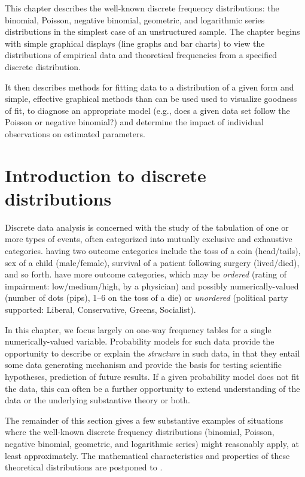 \documentclass[11pt]{book}\usepackage[]{graphicx}\usepackage[]{color}
\begin{document}
This chapter describes the well-known discrete
frequency distributions: the binomial, Poisson, negative binomial,
geometric, and logarithmic series distributions in the simplest case of an unstructured sample.
The chapter begins with simple graphical displays (line graphs and bar charts) to view
the distributions of empirical data and theoretical frequencies from a specified
discrete distribution.

It then describes methods for fitting data to a distribution of a given form
and simple, effective
graphical methods than can be used used to visualize goodness of fit,
to diagnose an appropriate model (e.g., does a given data set follow the
Poisson or negative binomial?) and determine the impact of
individual observations on estimated parameters.

\section{Introduction to discrete distributions}\label{sec:discrete-intro}
Discrete data analysis is concerned with the study of the tabulation of one or
more types of events, often categorized into mutually exclusive and exhaustive
categories.   having two outcome categories include
the toss of a coin (head/tails), sex of a child (male/female), survival of
a patient following surgery (lived/died), and so forth.  
have more outcome categories, which may be \emph{ordered}
(rating of impairment: low/medium/high, by a physician)
and possibly numerically-valued 
(number of dots (pips), 1--6 on the toss of a die) 
or \emph{unordered} (political party supported: Liberal, Conservative, Greens, Socialist).

In this chapter, we focus largely on one-way frequency tables for a single 
numerically-valued variable.
Probability models for such data provide the opportunity to describe or explain
the \emph{structure} in such data, in that they entail some data generating 
mechanism and provide the basis for testing scientific hypotheses, prediction of
future results.  If a given probability model does not fit the data, this can often
be a further opportunity to extend understanding of the data or the underlying
substantive theory or both.

The remainder of this section gives a few substantive examples of situations where the 
well-known discrete frequency distributions (binomial, Poisson, negative binomial,
geometric, and logarithmic series) might reasonably apply, at least approximately.
The mathematical characteristics and properties of these theoretical
distributions are postponed to .
\end{document}
